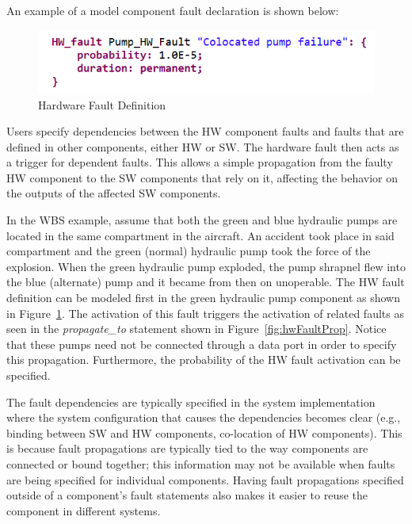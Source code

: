 An example of a model component fault declaration is shown below:
\begin{figure}[h!]
	\vspace{-0.2in}
	\begin{center}
		\includegraphics[width=.8\textwidth]{images/hw_fault2.png}
	\end{center}
	\vspace{-0.3in}
	\caption{Hardware Fault Definition}
	\label{fig:hwFault}
	\vspace{-0.2in}
\end{figure}

Users specify dependencies between the HW component faults and faults that are defined in other components, either HW or SW. The hardware fault then acts as a trigger for dependent faults. This allows a simple propagation from the faulty HW component to the SW components that rely on it, affecting the behavior on the outputs of the affected SW components.

In the WBS example, assume that both the green and blue hydraulic pumps are located in the same compartment in the aircraft. An accident took place in said compartment and the green (normal) hydraulic pump took the force of the explosion. When the green hydraulic pump exploded, the pump shrapnel flew into the blue (alternate) pump and it became from then on unoperable. The HW fault definition can be modeled first in the green hydraulic pump component as shown in Figure~\ref{fig:hwFault}. The activation of this fault triggers the activation of related faults as seen in the \textit{propagate\_to} statement shown in Figure~\ref{fig:hwFaultProp}. Notice that these pumps need not be connected through a data port in order to specify this propagation. Furthermore, the probability of the HW fault activation can be specified. 

The fault dependencies are typically specified in the system implementation where the system configuration that causes the dependencies becomes clear (e.g., binding between SW and HW components, co-location of HW components). This is because fault propagations are typically tied to the way components are connected or bound together; this information may not be available when faults are being specified for individual components. Having fault propagations specified outside of a component’s fault statements also makes it easier to reuse the component in different systems. 

